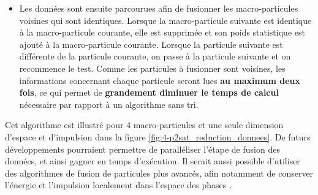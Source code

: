 \begin{refsection}
\begin{itemize}
\begin{itemize}
        \item Les données sont ensuite parcourues afin de fusionner les macro-particules voisines qui sont identiques. Lorsque la macro-particule suivante est identique à la macro-particule courante, elle est supprimée et son poids statistique est ajouté à la macro-particule courante. Lorsque la particule suivante est différente de la particule courante, on passe à la particule suivante et on recommence le test. Comme les particules à fusionner sont voisines, les informations concernant chaque particule seront lues \textbf{au maximum deux fois}, ce qui permet de \textbf{grandement diminuer le temps de calcul} nécessaire par rapport à un algorithme sans tri.
    \end{itemize}
\end{itemize}
Cet algorithme est illustré pour 4 macro-particules et une seule dimension d'espace et d'impulsion dans la figure \ref{fig:4-p2sat_reduction_donnees}. De futurs développements pourraient permettre de paralléliser l'étape de fusion des données, et ainsi gagner en temps d'exécution. Il serait aussi possible d'utiliser des algorithmes de fusion de particules plus avancés, afin notamment de conserver l'énergie et l'impulsion localement dans l'espace des phases \parencite{vranic_2015a}.


\end{refsection}
